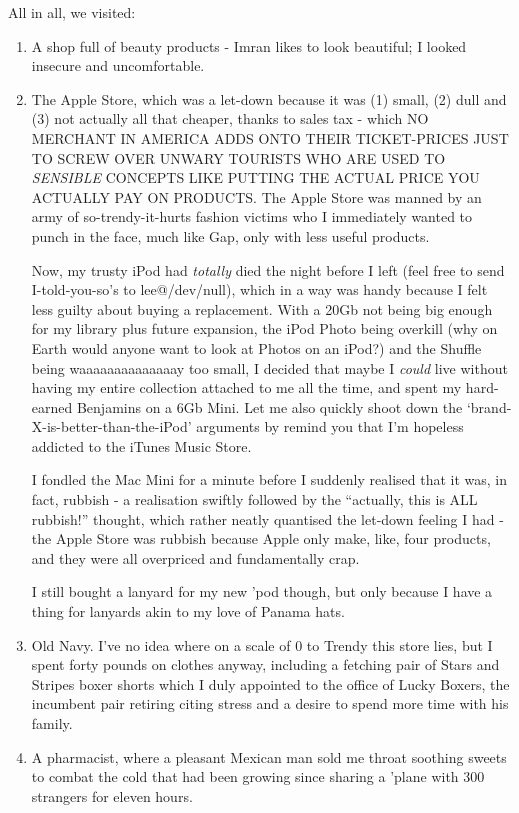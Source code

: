 \documentclass[b5paper,11pt,titlepage,draft]{book}
\begin{document}
All in all, we visited:
\begin{enumerate}
\item A shop full of beauty products - Imran likes to look beautiful; I looked insecure and uncomfortable.
\item The Apple Store, which was a let-down because it was (1) small, (2) dull and (3) not actually all that cheaper, thanks to sales tax - which NO MERCHANT IN AMERICA ADDS ONTO THEIR TICKET-PRICES JUST TO SCREW OVER UNWARY TOURISTS WHO ARE USED TO \emph{SENSIBLE} CONCEPTS LIKE PUTTING THE ACTUAL PRICE YOU ACTUALLY PAY ON PRODUCTS.  The Apple Store was manned by an army of so-trendy-it-hurts fashion victims who I immediately wanted to punch in the face, much like Gap, only with less useful products.

Now, my trusty iPod had \emph{totally} died the night before I left (feel free to send I-told-you-so's to lee@/dev/null), which in a way was handy because I felt less guilty about buying a replacement.  With a 20Gb not being big enough for my library plus future expansion, the iPod Photo being overkill (why on Earth would anyone want to look at Photos on an iPod?) and the Shuffle being waaaaaaaaaaaaaay too small, I decided that maybe I \emph{could} live without having my entire collection attached to me all the time, and spent my hard-earned Benjamins on a 6Gb Mini.  Let me also quickly shoot down the `brand-X-is-better-than-the-iPod' arguments by remind you that I'm hopeless addicted to the iTunes Music Store.

I fondled the Mac Mini for a minute before I suddenly realised that it was, in fact, rubbish - a realisation swiftly followed by the ``actually, this is ALL rubbish!'' thought, which rather neatly quantised the let-down feeling I had - the Apple Store was rubbish because Apple only make, like, four products, and they were all overpriced and fundamentally crap.

I still bought a lanyard for my new 'pod though, but only because I have a thing for lanyards akin to my love of Panama hats. 

\item Old Navy.  I've no idea where on a scale of 0 to Trendy this store lies, but I spent forty pounds on clothes anyway, including a fetching pair of Stars and Stripes boxer shorts which I duly appointed to the office of Lucky Boxers, the incumbent pair retiring citing stress and a desire to spend more time with his family.

\item A pharmacist, where a pleasant Mexican man sold me throat soothing sweets to combat the cold that had been growing since sharing a 'plane with 300 strangers for eleven hours.


\end{enumerate}
\end{document}
